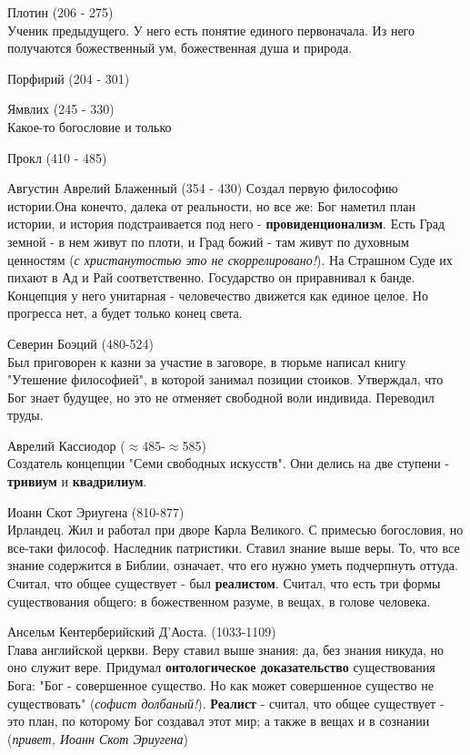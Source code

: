 \documentclass[12pt,a4paper]{article}
\begin{document}
Плотин (206 - 275)\\
Ученик предыдущего. У него есть понятие единого первоначала. Из него получаются божественный ум, божественная душа и природа.

Порфирий (204 - 301)

Ямвлих (245 - 330)\\
Какое-то богословие и только

Прокл (410 - 485)

Августин Аврелий Блаженный (354 - 430)
Создал первую философию истории.Она конечто, далека от реальности, но все же: Бог наметил план истории, и история подстраивается под него - \textbf{провиденционализм}. Есть Град земной - в нем живут по плоти, и Град божий - там живут по духовным ценностям (\textit{с христанутостью это не скоррелировано!}). На Страшном Суде их пихают в Ад и Рай соответственно. Государство он приравнивал к банде. Концепция у него унитарная - человечество движется как единое целое. Но прогресса нет, а будет только конец света.

Северин Боэций (480-524)\\
Был приговорен к казни за участие в заговоре, в тюрьме написал книгу "Утешение философией", в которой занимал позиции стоиков. Утверждал, что Бог знает будущее, но это не отменяет свободной воли индивида. Переводил труды.

Аврелий Кассиодор ($\approx$485-$\approx$585)\\
Создатель концепции "Семи свободных искусств". Они делись на две ступени - \textbf{тривиум} и \textbf{квадрилиум}.

Иоанн Скот Эриугена (810-877)\\
Ирландец. Жил и работал при дворе Карла Великого. С примесью  богословия, но все-таки философ. Наследник патристики. Ставил знание выше веры. То, что все знание содержится в Библии, означает, что его нужно уметь подчерпнуть оттуда. Считал, что общее существует - был \textbf{реалистом}. Считал, что есть три формы существования общего: в божественном разуме, в вещах, в голове человека.

Ансельм Кентерберийский Д'Аоста. (1033-1109)\\
Глава английской церкви. Веру ставил выше знания: да, без знания никуда, но оно служит вере. Придумал \textbf{онтологическое доказательство} существования Бога: "Бог - совершенное существо. Но как может совершенное существо не существовать" (\textit{софист долбаный!}). \textbf{Реалист} - считал, что общее существует  - это план, по которому Бог создавал этот мир; а также в вещах и в сознании (\textit{привет, Иоанн Скот Эриугена})
\end{document}
